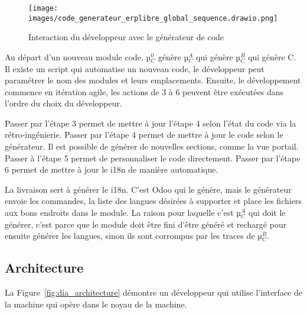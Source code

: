 \begin{figure}
\centering
\texttt{[image: images/code\_generateur\_erplibre\_global\_sequence.drawio.png]}
\caption{Interaction du développeur avec le générateur de code}
\label{fig:dia_sequence_gc}
\end{figure}

Au départ d’un nouveau module code, µ$_C^0$ génère µ$_C^A$ qui génère µ$_C^B$ qui génère C. Il existe un script qui automatise un nouveau code, le développeur peut paramétrer le nom des modules et leurs emplacements. Ensuite, le développement commence en itération agile, les actions de 3 à 6 peuvent être exécutées dans l’ordre du choix du développeur.


Passer par l’étape 3 permet de mettre à jour l’étape 4 selon l’état du code via la rétro-ingénierie. Passer par l’étape 4 permet de mettre à jour le code selon le générateur. Il est possible de générer de nouvelles sections, comme la vue portail. Passer à l’étape 5 permet de personnaliser le code directement. Passer par l’étape 6 permet de mettre à jour le i18n de manière automatique.

La livraison sert à générer le i18n. C’est Odoo qui le génère, mais le générateur envoie les commandes, la liste des langues désirées à supporter et place les fichiers aux bons endroits dans le module. La raison pour laquelle c’est µ$_C^A$ qui doit le générer, c’est parce que le module doit être fini d’être généré et rechargé pour ensuite générer les langues, sinon ils sont corrompus par les traces de µ$_C^B$.


\subsection{Architecture}\label{architecture_result}

La Figure~\ref{fig:dia_architecture} démontre un développeur qui utilise l'interface de la machine qui opère dans le noyau de la machine.

